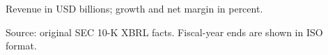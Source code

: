 \label{tab:latest}
{\footnotesize Revenue in USD billions; growth and net margin in percent.\par}
{\scriptsize\setlength{\tabcolsep}{3pt}\par}
{\footnotesize Source: original SEC 10-K XBRL facts. Fiscal-year ends are shown in ISO format.\par}
